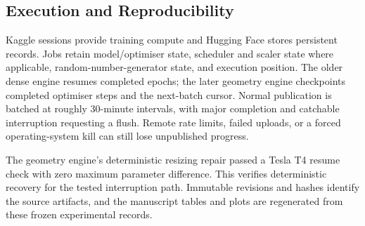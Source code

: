 \subsection{Execution and Reproducibility}
Kaggle sessions provide training compute and Hugging Face stores persistent records. Jobs retain model/optimiser state, scheduler and scaler state where applicable, random-number-generator state, and execution position. The older dense engine resumes completed epochs; the later geometry engine checkpoints completed optimiser steps and the next-batch cursor. Normal publication is batched at roughly 30-minute intervals, with major completion and catchable interruption requesting a flush. Remote rate limits, failed uploads, or a forced operating-system kill can still lose unpublished progress.

The geometry engine's deterministic resizing repair passed a Tesla T4 resume check with zero maximum parameter difference. This verifies deterministic recovery for the tested interruption path. Immutable revisions and hashes identify the source artifacts, and the manuscript tables and plots are regenerated from these frozen experimental records.
